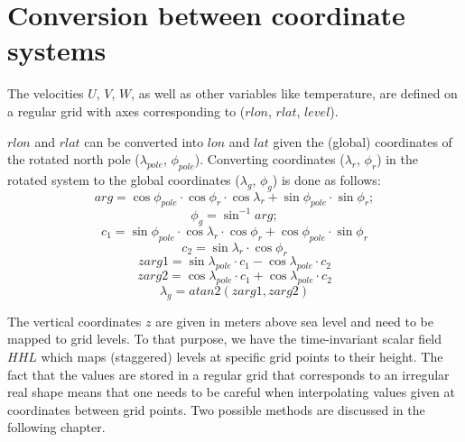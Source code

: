 \section{Conversion between coordinate systems}\label{sec:conversion}
The velocities $U$, $V$, $W$, as well as other variables like temperature, are defined on a regular grid with axes corresponding to ($rlon$, $rlat$, $level$).

$rlon$ and $rlat$ can be converted into $lon$ and $lat$ given the (global) coordinates of the rotated north pole ($\lambda_{pole}$, $\phi_{pole}$). Converting coordinates ($\lambda_r$, $\phi_r$) in the rotated system to the global coordinates ($\lambda_g$, $\phi_g$) is done as follows: 
\begin{equation}
arg = \cos \phi_{pole} \cdot \cos \phi_r \cdot \cos \lambda_r + \sin \phi_{pole} \cdot \sin \phi_r;
\end{equation}
\begin{equation}
		\phi_g = \sin^{-1} arg;
\end{equation}
\begin{equation}
		c_1 = \sin \phi_{pole} \cdot \cos \lambda_r \cdot \cos \phi_r + \cos \phi_{pole} \cdot \sin \phi_r
\end{equation}
\begin{equation}
		c_2 = \sin \lambda_r \cdot \cos \phi_r
\end{equation}
\begin{equation}
		zarg1 = \sin \lambda_{pole} \cdot c_1 - \cos \lambda_{pole} \cdot c_2
\end{equation}
\begin{equation}
		zarg2 = \cos \lambda_{pole} \cdot c_1 + \cos \lambda_{pole} \cdot c_2
\end{equation}
\begin{equation}
		\lambda_g = atan2(zarg1,zarg2)
\end{equation}

The vertical coordinates $z$ are given in meters above sea level and need to be mapped to grid levels. To that purpose, we have the time-invariant scalar field $HHL$ which maps (staggered) levels at specific grid points to their height.
The fact that the values are stored in a regular grid that corresponds to an irregular real shape means that one needs to be careful when interpolating values given at coordinates between grid points. Two possible methods are discussed in the following chapter.



